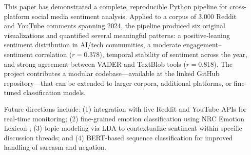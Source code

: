 \documentclass[conference]{IEEEtran}
\begin{document}
This paper has demonstrated a complete, reproducible Python pipeline for
cross-platform social media sentiment analysis. Applied to a corpus of
3{,}000 Reddit and YouTube comments spanning 2024, the pipeline produced
six original visualizations and quantified several meaningful patterns:
a positive-leaning sentiment distribution in AI/tech communities, a
moderate engagement--sentiment correlation ($r = 0.378$), temporal
stability of sentiment across the year, and strong agreement between
VADER and TextBlob tools ($r = 0.818$). The project contributes a
modular codebase---available at the linked GitHub repository---that can
be extended to larger corpora, additional platforms, or fine-tuned
classification models.

Future directions include: (1) integration with live Reddit and YouTube
APIs for real-time monitoring; (2) fine-grained emotion classification
using NRC Emotion Lexicon \cite{nrc_lexicon}; (3) topic modeling via
LDA to contextualize sentiment within specific discussion threads; and
(4) BERT-based sequence classification for improved handling of sarcasm
and negation.
\end{document}
